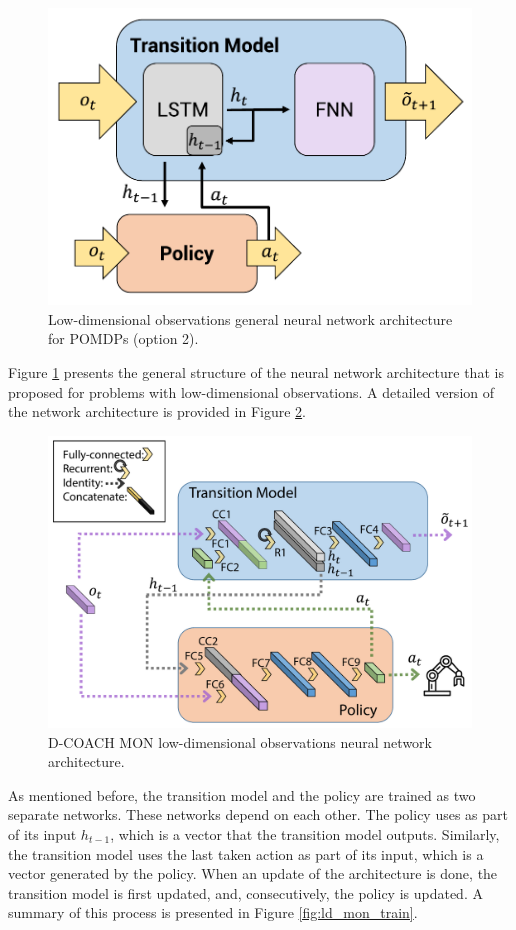 \newpage

\begin{figure}[H]
    \centering
    \includegraphics[width=0.5\linewidth]{imagenes/cap4/ld_model.pdf}
    \caption{Low-dimensional observations general neural network architecture for POMDPs (option 2).}
    \label{fig:ld_model_win}
\end{figure}

Figure \ref{fig:ld_model_win} presents the general structure of the neural network architecture that is proposed for problems with low-dimensional observations. A detailed version of the network architecture is provided in Figure \ref{fig:detailed_ld}.

\begin{figure}[h]
    \centering
    \includegraphics[width=0.8\linewidth]{imagenes/cap4/ld_model_det.pdf}
    \caption{D-COACH MON low-dimensional observations neural network architecture.}
    \label{fig:detailed_ld}
\end{figure}

As mentioned before, the transition model and the policy are trained as two separate networks. These networks depend on each other. The policy uses as part of its input $h_{t-1}$, which is a vector that the transition model outputs. Similarly, the transition model uses the last taken action as part of its input, which is a vector generated by the policy. When an update of the architecture is done, the transition model is first updated, and, consecutively, the policy is updated. A summary of this process is presented in Figure \ref{fig:ld_mon_train}.

